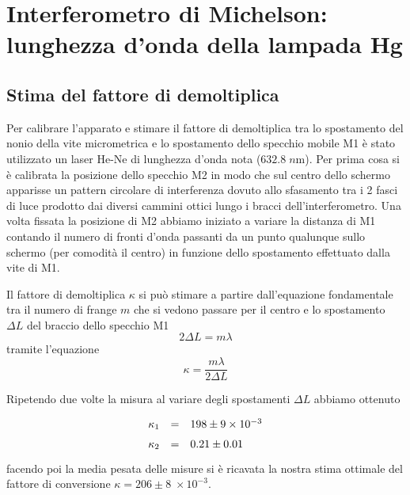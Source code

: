 \documentclass[10pt, a4paper, italian]{article}
\begin{document}
\section{Interferometro di Michelson: lunghezza d'onda della lampada Hg}
\subsection{Stima del fattore di demoltiplica}
Per calibrare l'apparato e stimare il fattore di demoltiplica tra lo
spostamento del nonio della vite micrometrica e lo spostamento dello
specchio mobile M1 è stato utilizzato un laser He-Ne di lunghezza d'onda nota
($632.8 \; \si{n\m}$).
Per prima cosa si è calibrata la posizione dello specchio M2 in modo che sul
centro dello schermo apparisse un pattern circolare di interferenza dovuto
allo sfasamento tra i 2 fasci di luce prodotto dai diversi cammini ottici
lungo i bracci dell'interferometro.
Una volta fissata la posizione di M2 abbiamo iniziato a variare la distanza
di M1 contando il numero di fronti d'onda passanti da un punto qualunque
sullo schermo (per comodità il centro) in funzione dello spostamento
effettuato dalla vite di M1. 

Il fattore di demoltiplica $\kappa$ si può stimare a partire dall'equazione
fondamentale tra il numero di frange $m$ che si vedono passare per il centro
e lo spostamento $\Delta L$ del braccio dello specchio M1
\begin{equation}\label{eq: fond}
2 \Delta L = m \lambda
\end{equation}
tramite l'equazione
\begin{equation}\label{eq: dem}
\kappa = \frac{m \lambda}{2 \Delta L}
\end{equation}

Ripetendo due volte la misura al variare degli spostamenti $\Delta L$ abbiamo
ottenuto 
\[
\def\arraystretch{1.5}
\begin{array}{rcl}
\kappa_1 & = & 198 \pm 9 \times 10^{-3} \\
\kappa_2 & = & 0.21 \pm 0.01 \\
\end{array}
\]
facendo poi la media pesata delle misure si è ricavata la nostra stima
ottimale del fattore di conversione
$\kappa = 206 \pm 8 \; \times 10^{-3}$.
\end{document}
